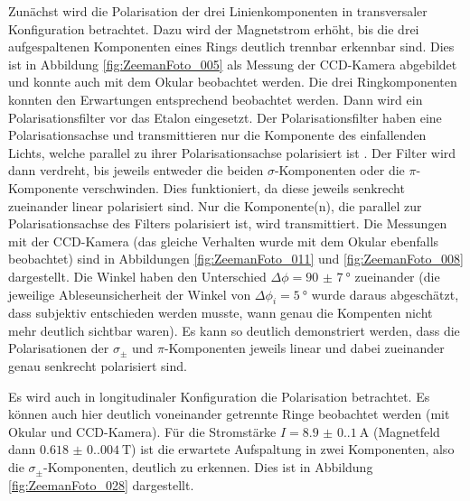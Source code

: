 Zunächst wird die Polarisation der drei Linienkomponenten in transversaler Konfiguration betrachtet. Dazu wird der Magnetstrom erhöht, bis die drei aufgespaltenen Komponenten eines Rings deutlich trennbar erkennbar sind. Dies ist in Abbildung \ref{fig:ZeemanFoto_005} als Messung der CCD-Kamera abgebildet und konnte auch mit dem Okular beobachtet werden. Die drei Ringkomponenten konnten den Erwartungen entsprechend beobachtet werden.
Dann wird ein Polarisationsfilter vor das Etalon eingesetzt. Der Polarisationsfilter haben eine Polarisationsachse und transmittieren nur die Komponente des einfallenden Lichts, welche parallel zu ihrer Polarisationsachse polarisiert ist \cite[564-565]{gerthsen}. Der Filter wird dann verdreht, bis jeweils entweder die beiden $\sigma$-Komponenten oder die $\pi$-Komponente verschwinden. Dies funktioniert, da diese jeweils senkrecht zueinander linear polarisiert sind. Nur die Komponente(n), die parallel zur Polarisationsachse des Filters polarisiert ist, wird transmittiert. Die Messungen mit der CCD-Kamera (das gleiche Verhalten wurde mit dem Okular ebenfalls beobachtet) sind in Abbildungen \ref{fig:ZeemanFoto_011} und \ref{fig:ZeemanFoto_008} dargestellt. Die Winkel haben den Unterschied $\Delta \phi = \SI{90(7)}{\degree}$ zueinander (die jeweilige Ableseunsicherheit der Winkel von $\Delta \phi_i= \SI{5}{\degree}$ wurde daraus abgeschätzt, dass subjektiv entschieden werden musste, wann genau die Kompenten nicht mehr deutlich sichtbar waren). Es kann so deutlich demonstriert werden, dass die Polarisationen der $\sigma_\pm$ und $\pi$-Komponenten jeweils linear und dabei zueinander genau senkrecht polarisiert sind.


Es wird auch in longitudinaler Konfiguration die Polarisation betrachtet. Es können auch hier deutlich voneinander getrennte Ringe beobachtet werden (mit Okular und CCD-Kamera). Für die Stromstärke $I=\SI{8.9(0.1)}{\ampere}$ (Magnetfeld dann $\SI{0.618(0.004)}{\tesla}$) ist die erwartete Aufspaltung in zwei Komponenten, also die $\sigma_\pm$-Komponenten, deutlich zu erkennen. Dies ist in Abbildung \ref{fig:ZeemanFoto_028} dargestellt.

